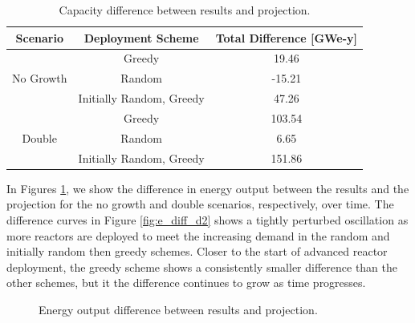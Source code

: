 \begin{table}[H]
    \centering
    \caption{Capacity difference between results and projection.}
    \label{tab:cap_diff}
    \begin{tabular}{c c c}
        \hline
        Scenario & Deployment Scheme & Total Difference [GWe-y]\\
        \hline
        \multirow{3}{*}{No Growth} & Greedy & 19.46 \\
        & Random & -15.21 \\
        & Initially Random, Greedy & 47.26 \\
        \hline
        \multirow{3}{*}{Double} & Greedy & 103.54 \\
        & Random & 6.65 \\
        & Initially Random, Greedy & 151.86 \\
        \hline
    \end{tabular}
\end{table}

In Figures \ref{fig:e_diff}, we show the difference in energy output between the results and the projection for the no growth and double scenarios, respectively, over time. The difference curves in Figure \ref{fig:e_diff_d2} shows a tightly perturbed oscillation as more reactors are deployed to meet the increasing demand in the random and initially random then greedy schemes. Closer to the start of advanced reactor deployment, the greedy scheme shows a consistently smaller difference than the other schemes, but it the difference continues to grow as time progresses.

\begin{figure}[H]
    \hfill
    \caption{Energy output difference between results and projection.}
    \label{fig:e_diff}
\end{figure}

